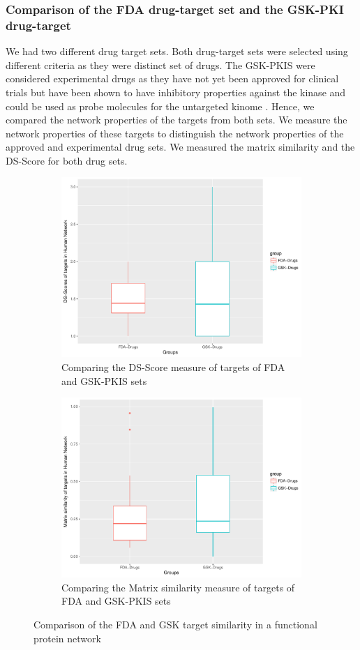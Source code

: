 \documentclass[a4paper, 11pt]{report}
\begin{document}
\subsubsection{Comparison of the FDA drug-target set and the GSK-PKI drug-target}
We had two different drug target sets. Both drug-target sets were selected using different criteria as they were distinct set of drugs. The GSK-PKIS were considered experimental drugs as they have not yet been approved for clinical trials but have been shown to have inhibitory properties against the kinase and could be used as probe molecules for the untargeted kinome \cite{dranchak2013profile}. Hence, we compared the network properties of the targets from both sets. We measure the network properties of these targets to distinguish the network properties of the approved and experimental drug sets. We measured the matrix similarity and the DS-Score for both drug sets.
\begin{figure}[H]
\centering
\begin{subfigure}{\textwidth}
	\includegraphics[width=.7\linewidth]{figures/dsscoreFDGS.pdf}
	\centering
	\caption{Comparing the DS-Score measure of targets of FDA and GSK-PKIS sets}
	\label{ksimgsk}
\end{subfigure}
\begin{subfigure}{\textwidth}
	\includegraphics[width=.7\linewidth]{figures/ksimscoreFDGS.pdf}
	\centering
	\caption{Comparing the Matrix similarity measure of targets of FDA and GSK-PKIS sets}
	\label{dsgsk}
\end{subfigure}
\caption{Comparison of the FDA and GSK target similarity in a functional protein network }
\label{simfdagsk}
\end{figure}
\end{document}
